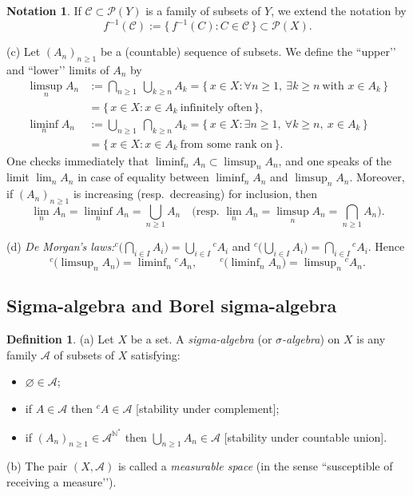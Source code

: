 \documentclass[11pt]{article}
\theoremstyle{definition}
\newtheorem{definition}{Definition}[section]
\newtheorem{notation}{Notation}[section]
\begin{document}
\begin{notation}
	If $\mathscr C\subset\mathcal P(Y)$ is a family of subsets of $Y$, we extend the notation by
\[
f^{-1}(\mathscr C):=\{\,f^{-1}(C): C\in\mathscr C\,\}\subset\mathcal P(X).
\]

\medskip\noindent
(c) Let $(A_n)_{n\ge1}$ be a (countable) sequence of subsets. We define the “upper’’ and “lower’’ limits of $A_n$ by
\[
\begin{aligned}
\limsup_{n} A_n
&:= \bigcap_{n\ge1}\ \bigcup_{k\ge n} A_k
= \{\,x\in X: \forall n\ge1,\ \exists k\ge n\ \text{with } x\in A_k\,\}\\
&= \{\,x\in X: x\in A_k\ \text{infinitely often}\,\},\\[3pt]
\liminf_{n} A_n
&:= \bigcup_{n\ge1}\ \bigcap_{k\ge n} A_k
= \{\,x\in X: \exists n\ge1,\ \forall k\ge n,\ x\in A_k\,\}\\
&= \{\,x\in X: x\in A_k\ \text{from some rank on}\,\}.
\end{aligned}
\]
One checks immediately that $\liminf_{n} A_n\subset\limsup_{n} A_n$, and one speaks of the limit $\lim_{n} A_n$ in case of equality between $\liminf_{n} A_n$ and $\limsup_{n} A_n$.
Moreover, if $(A_n)_{n\ge1}$ is increasing (resp.\ decreasing) for inclusion, then
\[
\lim_{n} A_n=\liminf_{n} A_n=\bigcup_{n\ge1} A_n
\quad\text{(resp.\ } \lim_{n} A_n=\limsup_{n} A_n=\bigcap_{n\ge1} A_n\text{)}.
\]

\medskip\noindent
(d) \textit{De Morgan’s laws:}\quad ${}^{c}\!\bigl(\bigcap_{i\in I}A_i\bigr)=\bigcup_{i\in I}{}^{c}\!A_i$ and ${}^{c}\!\bigl(\bigcup_{i\in I}A_i\bigr)=\bigcap_{i\in I}{}^{c}\!A_i$.
Hence
\[
{}^{c}\!\bigl(\limsup\nolimits_{n}A_n\bigr)=\liminf\nolimits_{n}{}^{c}\!A_n,
\qquad
{}^{c}\!\bigl(\liminf\nolimits_{n}A_n\bigr)=\limsup\nolimits_{n}{}^{c}\!A_n.
\]
\end{notation} 

\subsection{Sigma-algebra and Borel sigma-algebra}\label{subsec:3.1}

\begin{definition}
(a) Let $X$ be a set. A \emph{sigma-algebra} (or \emph{$\sigma$-algebra}) on $X$ is any family $\mathcal A$ of subsets of $X$ satisfying:
\begin{itemize}[leftmargin=1.5em]
\item[(i)] $\varnothing\in\mathcal A$;
\item[(ii)] if $A\in\mathcal A$ then ${}^{c}\!A\in\mathcal A$ \hfill[stability under complement];
\item[(iii)] if $(A_n)_{n\ge1}\in\mathcal A^{\mathbb N^{\!*}}$ then $\displaystyle \bigcup_{n\ge1} A_n\in\mathcal A$ \hfill[stability under countable union].
\end{itemize}
(b) The pair $(X,\mathcal A)$ is called a \emph{measurable space} (in the sense “susceptible of receiving a measure’’).
\end{definition}
\end{document}

